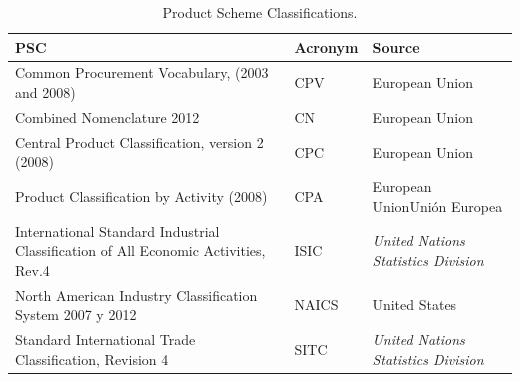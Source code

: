 \begin{table}[!ht]
\renewcommand{\arraystretch}{1.3}
\begin{center}
\begin{tabular}[c]{|p{6cm}|l|p{6cm}|} 
\hline
  \textbf{PSC} &  \textbf{Acronym} & \textbf{Source} \\\hline
  Common Procurement Vocabulary, (2003 and 2008) & CPV & European Union \\ \hline
  Combined Nomenclature 2012 & CN & European Union \\ \hline
  Central Product Classification, version 2 (2008) & CPC & European Union \\ \hline
  Product Classification by Activity (2008) & CPA & European UnionUnión Europea \\ \hline
  International Standard Industrial Classification of All Economic Activities, Rev.4 & ISIC & \textit{United Nations Statistics Division} \\ \hline
  North American Industry Classification System 2007 y 2012 & NAICS & United States \\ \hline
  Standard International Trade Classification, Revision 4 & SITC & \textit{United Nations Statistics Division} \\ \hline
\hline
\end{tabular}
\caption{Product Scheme Classifications.}\label{table:pscs-ld}
  \end{center}
\end{table} 

